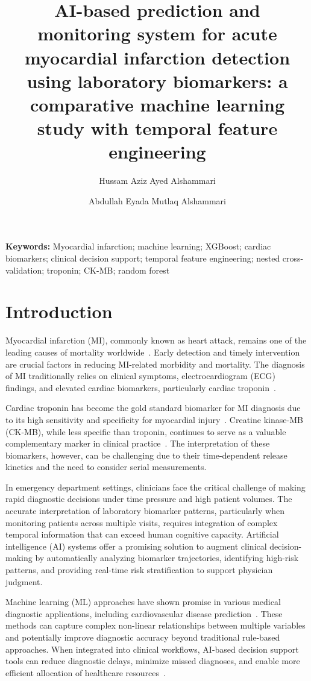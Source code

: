 \documentclass[fleqn,10pt,lineno]{wlpeerj}
\title{AI-based prediction and monitoring system for acute myocardial infarction detection using laboratory biomarkers: a comparative machine learning study with temporal feature engineering}
\author[1]{Hussam Aziz Ayed Alshammari}
\author[1]{Abdullah Eyada Mutlaq Alshammari}
\affil[1]{Artificial Intelligence and Data Science Department,
          College of Computer Science and Engineering,
          University of Hail, Hail 2440, Saudi Arabia}
\begin{document}
\flushbottom
\maketitle
\thispagestyle{empty}

\noindent\textbf{Keywords:} Myocardial infarction; machine learning; XGBoost; cardiac biomarkers; clinical decision support; temporal feature engineering; nested cross-validation; troponin; CK-MB; random forest


\section*{Introduction}

Myocardial infarction (MI), commonly known as heart attack, remains one of the leading causes of mortality worldwide~\citep{Thygesen2018}. Early detection and timely intervention are crucial factors in reducing MI-related morbidity and mortality. The diagnosis of MI traditionally relies on clinical symptoms, electrocardiogram (ECG) findings, and elevated cardiac biomarkers, particularly cardiac troponin~\citep{Amsterdam2014, Collet2021}.

Cardiac troponin has become the gold standard biomarker for MI diagnosis due to its high sensitivity and specificity for myocardial injury~\citep{Reichlin2009, Chapman2020}. Creatine kinase-MB (CK-MB), while less specific than troponin, continues to serve as a valuable complementary marker in clinical practice~\citep{Aydin2019}. The interpretation of these biomarkers, however, can be challenging due to their time-dependent release kinetics and the need to consider serial measurements.

In emergency department settings, clinicians face the critical challenge of making rapid diagnostic decisions under time pressure and high patient volumes. The accurate interpretation of laboratory biomarker patterns, particularly when monitoring patients across multiple visits, requires integration of complex temporal information that can exceed human cognitive capacity. Artificial intelligence (AI) systems offer a promising solution to augment clinical decision-making by automatically analyzing biomarker trajectories, identifying high-risk patterns, and providing real-time risk stratification to support physician judgment.

Machine learning (ML) approaches have shown promise in various medical diagnostic applications, including cardiovascular disease prediction~\citep{Attia2019, Rajkomar2019, Topol2019}. These methods can capture complex non-linear relationships between multiple variables and potentially improve diagnostic accuracy beyond traditional rule-based approaches. When integrated into clinical workflows, AI-based decision support tools can reduce diagnostic delays, minimize missed diagnoses, and enable more efficient allocation of healthcare resources~\citep{Wiens2019}.
\end{document}
